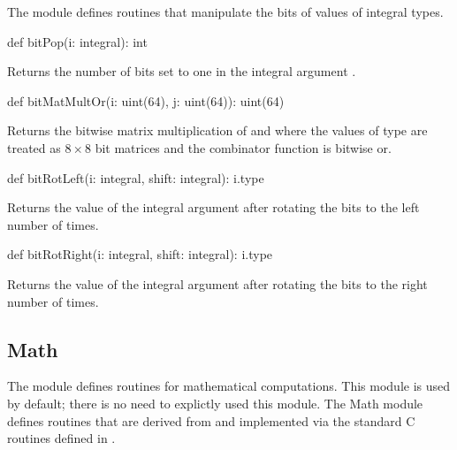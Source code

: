 The module  defines routines that manipulate the bits of
values of integral types.

\vspace{1pc}

\begin{protohead}
def bitPop(i: integral): int
\end{protohead}
\begin{protobody}
Returns the number of bits set to one in the integral
argument .
\end{protobody}

\begin{protohead}
def bitMatMultOr(i: uint(64), j: uint(64)): uint(64)
\end{protohead}
\begin{protobody}
Returns the bitwise matrix multiplication of  and 
where the values of  type are treated as $8 \times 8$
bit matrices and the combinator function is bitwise or.
\end{protobody}

\begin{protohead}
def bitRotLeft(i: integral, shift: integral): i.type
\end{protohead}
\begin{protobody}
Returns the value of the integral argument  after rotating the
bits to the left  number of times.
\end{protobody}

\begin{protohead}
def bitRotRight(i: integral, shift: integral): i.type
\end{protohead}
\begin{protobody}
Returns the value of the integral argument  after rotating the
bits to the right  number of times.
\end{protobody}

\subsection{Math}
\label{Math}

The module  defines routines for mathematical computations.
This module is used by default; there is no need to explictly used
this module.  The Math module defines routines that are derived from
and implemented via the standard C routines defined in .

\vspace{1pc}

